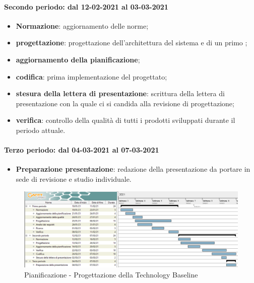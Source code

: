 \paragraph{Secondo periodo: dal 12-02-2021 al 03-03-2021} 
\begin{itemize} 
	\item \textbf{Normazione}: aggiornamento delle norme; 
	\item \textbf{progettazione}: progettazione dell'architettura del sistema e di un primo ;
	\item \textbf{aggiornamento della pianificazione}; 
	\item \textbf{codifica}: prima implementazione del  progettato; 
	\item \textbf{stesura della lettera di presentazione}: scrittura della lettera di presentazione con la quale ci si candida alla revisione di progettazione; 
	\item \textbf{verifica}: controllo della qualità di tutti i prodotti sviluppati durante il periodo attuale. 
\end{itemize}	 

\paragraph{Terzo periodo: dal 04-03-2021 al 07-03-2021} 
\begin{itemize} 
	\item \textbf{Preparazione presentazione}: redazione della presentazione da portare in sede di revisione e studio individuale. 
\end{itemize} 

\newpage 

\begin{landscape} 
	\begin{figure}[h!] 
		\includegraphics[width=24cm]{images/3_Progettazione_della_Technology.png} 
		\caption{Pianificazione - Progettazione della Technology Baseline} 
	\end{figure} 
\end{landscape} 

